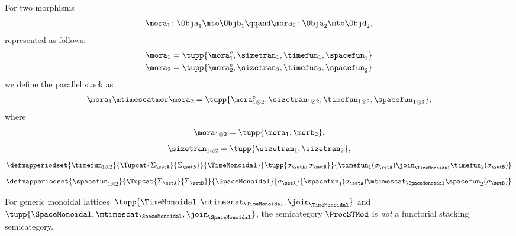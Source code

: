 \begin{lemma}
    For two morphisms
    \begin{equation}
        \mora_1 \colon \Obja_1 \mto \Objb_1
        \qqand
        \mora_2 \colon \Obja_2 \mto \Objd_2,
    \end{equation}
    represented as follows:
    \begin{align}
        \mora_1 & = \tupp{\mora^e_1, \sizetran_1,  \timefun_1,
        \spacefun_{1}  } \\
        \mora_2 & = \tupp{\mora^e_2, \sizetran_2,  \timefun_2, \spacefun_{2} }
    \end{align}
    we define the parallel stack as
    \begin{equation}
        \mora_1 \mtimescatmor \mora_2 = \tupp{
        \mora^e_{1\otimes2},
        \sizetran_{1\otimes2},
        \timefun_{1\otimes2},
        \spacefun_{1\otimes2}
        },
    \end{equation}
    where
    \begin{equation}
        \mora_{1\otimes2} = \tupp{\mora_1, \morb_2},
    \end{equation}
    \begin{equation}
        \sizetran_{1\otimes2} =  \tupp{\sizetran_1, \sizetran_2},
    \end{equation}
    \begin{equation}
        \defmapperiodset{
            \timefun_{1\otimes 2}
        }{
            \Tupcat {\Sigma_{\setA}} {\Sigma_{\setB}}
        }{
            \TimeMonoidal
        }{
            \tupp{\sigma_{\setA}, \sigma_{\setB}}
        }{
            \timefun_1(\sigma_{\setA}) \join_{\TimeMonoidal} \timefun_2(\sigma_{\setB})
        }
    \end{equation}
    \begin{equation}
        \defmapperiodset{
            \spacefun_{1\otimes2}
        }{
            \Tupcat {\Sigma_{\setA}} {\Sigma_{\setB}}
        }{
            \SpaceMonoidal
        }{
            \sigma_{\setA}
        }{
            \spacefun_1(\sigma_{\setA}) \mtimescat_{\SpaceMonoidal} \spacefun_2(\sigma_{\setB})
        }
    \end{equation}
\end{lemma}

\begin{lemma}
    For generic monoidal lattices~$\tupp{\TimeMonoidal, \mtimescat_{\TimeMonoidal}, \join_{\TimeMonoidal}}$ and $\tupp{\SpaceMonoidal, \mtimescat_{\SpaceMonoidal}, \join_{\SpaceMonoidal}}$, the semicategory $\ProcSTMod$  is \emph{not} a functorial stacking semicategory.
\end{lemma}

